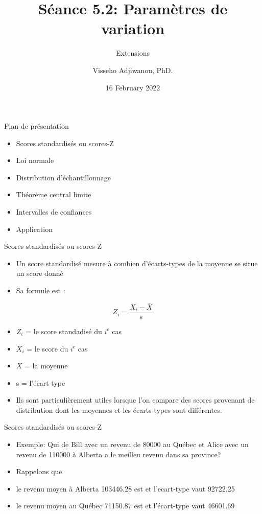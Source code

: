 \documentclass[ignorenonframetext,]{beamer}
\title{Séance 5.2: Paramètres de variation}
\subtitle{Extensions}
\author{Visseho Adjiwanou, PhD.}
\date{16 February 2022}
\providecommand{\tightlist}{%
  \setlength{\itemsep}{0pt}\setlength{\parskip}{0pt}}
\begin{document}
\frame{\titlepage}

\begin{frame}{Plan de présentation}

\begin{itemize}
\tightlist
\item
  Scores standardisés ou scores-Z
\item
  Loi normale
\item
  Distribution d'échantillonnage
\item
  Théorème central limite
\item
  Intervalles de confiances
\item
  Application
\end{itemize}

\end{frame}

\begin{frame}{Scores standardisés ou scores-Z}

\begin{itemize}
\tightlist
\item
  Un score standardisé mesure à combien d'écarts-types de la moyenne se
  situe un score donné
\item
  Sa formule est :
\end{itemize}

\[ Z_i = \frac{X_i - \bar{X}}{s}\]

\begin{itemize}
\item
  \(Z_i\) = le score standadisé du \(i^e\) cas
\item
  \(X_i\) = le score du \(i^e\) cas
\item
  \(\bar{X}\) = la moyenne
\item
  s = l'écart-type
\item
  Ils sont particulièrement utiles lorsque l'on compare des scores
  provenant de distribution dont les moyennes et les écarts-types sont
  différentes.
\end{itemize}

\end{frame}

\begin{frame}{Scores standardisés ou scores-Z}

\begin{itemize}
\item
  Exemple: Qui de Bill avec un revenu de 80000 au Québec et Alice avec
  un revenu de 110000 à Alberta a le meilleu revenu dans sa province?
\item
  Rappelons que
\item
  le revenu moyen à Alberta 103446.28 est et l'ecart-type vaut 92722.25
\item
  le revenu moyen au Québec 71150.87 est et l'écart-type vaut 46601.69
\end{itemize}

\end{frame}
\end{document}
